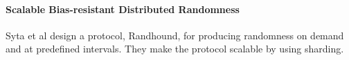 \paragraph{Scalable Bias-resistant Distributed Randomness}
Syta et al \cite{syta2017scalable} design a protocol, Randhound, for producing randomness on demand and at predefined intervals. They make the protocol scalable by using sharding. 